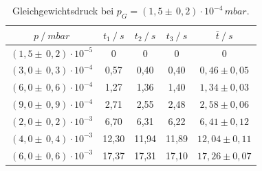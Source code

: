 \begin{table}[H]
\centering
\begin{tabular}{c|c|c|c|c}
	{$p \:/\: \si{mbar}$} & {$t_1 \:/\: \si{s} $} & {$t_2 \:/\: \si{s} $} & {$t_3 \:/\: \si{s} $} & {$\bar{t} \:/\: \si{s}$}\\
\midrule
$(1,5 \pm \, 0,2)\cdot 10^{-5}$ &0 &0 &0 &0\\
$(3,0 \pm \, 0,3)\cdot 10^{-4}$ &   0,57 &  0,40 &  0,40 & $0,46 \pm 0,05$\\
$(6,0 \pm \, 0,6)\cdot 10^{-4}$ &   1,27  &  1,36 &  1,40 & $1,34 \pm 0,03 $\\
$(9,0 \pm \, 0,9)\cdot 10^{-4}$ &   2,71 &  2,55 &  2,48 & $2,58 \pm 0,06 $\\
$(2,0 \pm \, 0,2)\cdot 10^{-3}$ &   6,70 &  6,31 &  6,22 & $6,41 \pm 0,12 $\\
$(4,0 \pm \, 0,4)\cdot 10^{-3}$ &   12,30 &  11,94 &  11,89 & $12,04 \pm 0,11 $\\
$(6,0 \pm \, 0,6)\cdot 10^{-3}$ &  17,37 & 17,31 & 17,10 & $17,26 \pm 0,07 $\\
\end{tabular}
\caption{Gleichgewichtsdruck bei $p_G=(1,5 \pm \, 0,2)\cdot 10^{-4} \, \si{mbar}$.}
\label{tab:leck_Turbo3}
\end{table}


